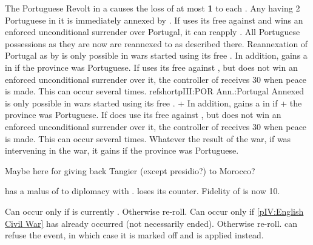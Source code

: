 \phpaix
\aparag The Portuguese Revolt in a \COL causes the loss of at most {\bf 1}
\STAB to each \MAJ.
\aparag Any \COL having 2 Portuguese \REVOLT \faceplus in it is immediately
annexed by \paysPortugal.
\aparag If \SPA uses its free \CB against \paysPortugal and wins an enforced
unconditional surrender over Portugal, it can reapply . All Portuguese possessions as they are now are
reannexed to \SPA as described there. Reannexation of Portugal as by
 is only possible in wars \SPA
started using its free \CB. In addition, \SPA gains a \Presidio in
\provinceTanger if the province was Portuguese.
\aparag If \SPA uses its free \CB against \paysPortugal, but does not win an
enforced unconditional surrender over it, the controller of \paysPortugal
receives 30 \VP when peace is made. This can occur several times.
refshort{pIII:POR Ann.:Portugal Annexed} is only possible in wars \SPA started
using its free \CB.  + \fphase In addition, \SPA gains a \Presidio in
 if + the province was Portuguese.  \ephase If \SPA does use
its free \CB against , but does not win an enforced
unconditional surrender over it, the controller of  receives 30
\VP when peace is made. This can occur several times.
\aparag Whatever the result of the war, if \ENG was intervening in the war, it
gains \provinceTanger if the province was Portuguese.




\begin{todo}
  Maybe here for giving back Tangier (except presidio?) to Morocco?
\end{todo}


\effetlong
\aparag \TUR has a malus of  to diplomacy with \paysmaroc.
\aparag \paysmaroc loses its \corsaire counter.
\aparag Fidelity of \paysmaroc is now 10.





\condition{}
\aparag Can occur only if \ENG is currently \PROTANG. Otherwise re-roll.
\aparag Can occur only if \ref{pIV:English Civil War} has already occurred
(not necessarily ended). Otherwise re-roll.
\aparag \ENG can refuse the event, in which case it is marked off and \RD is
applied instead.

